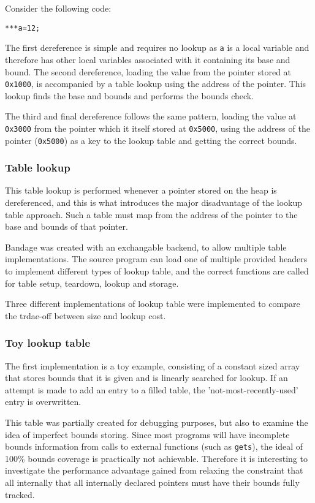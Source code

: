 Consider the following code:

\begin{verbatim}
***a=12;
\end{verbatim}

The first dereference is simple and requires no lookup as \verb!a! is a local variable and therefore has other local variables associated with it containing its base and bound.
The second dereference, loading the value from the pointer stored at \verb!0x1000!, is accompanied by a table lookup using the address of the pointer.
This lookup finds the base and bounds and performs the bounds check.

The third and final dereference follows the same pattern, loading the value at \verb!0x3000! from the pointer which it itself stored at \verb!0x5000!, using the address of the pointer (\verb!0x5000!) as a key to the lookup table and getting the correct bounds.

\subsubsection{Table lookup}

This table lookup is performed whenever a pointer stored on the heap is dereferenced, and this is what introduces the major disadvantage of the lookup table approach.
Such a table must map from the address of the pointer to the base and bounds of that pointer.

Bandage was created with an exchangable backend, to allow multiple table implementations.
The source program can load one of multiple provided headers to implement different types of lookup table, and the correct functions are called for table setup, teardown, lookup and storage.

Three different implementations of lookup table were implemented to compare the trdae-off between size and lookup cost.

\subsubsection{Toy lookup table}

The first implementation is a toy example, consisting of a constant sized array that stores bounds that it is given and is linearly searched for lookup.
If an attempt is made to add an entry to a filled table, the 'not-most-recently-used' entry is overwritten.

This table was partially created for debugging purposes, but also to examine the idea of imperfect bounds storing.
Since most programs will have incomplete bounds information from calls to external functions (such as \verb!gets!), the ideal of 100\% bounds coverage is practically not achievable.
Therefore it is interesting to investigate the performance advantage gained from relaxing the constraint that all internally that all internally declared pointers must have their bounds fully tracked.

